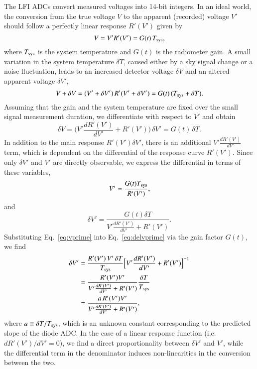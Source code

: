\documentclass[twocolumn]{aa}
\begin{document}
The LFI ADCs convert measured voltages into 14-bit integers. In an ideal world, the conversion from the true voltage $V$ to the apparent (recorded) voltage $V'$ should follow a perfectly linear response $R'(V')$ given by
\begin{equation}
V = V'R'(V') = G(t)\,T_{\rm sys},
\label{eq:perfect}
\end{equation}
where $T_{\rm sys}$ is the system temperature and $G(t)$ is the radiometer gain. A small variation in the system temperature $\delta T$, caused either by a sky signal change or a noise fluctuation, leads to an increased detector voltage $\delta V$ and an altered apparent voltage $\delta V'$,
\begin{equation}
V+\delta V = (V' + \delta V')\,R'(V' + \delta V') = G(t)\,(T_{\rm sys}+\delta T).
\label{eq:perturbation}
\end{equation}
Assuming that the gain and the system temperature are fixed over the small signal measurement duration, we differentiate with respect to $V'$ and obtain
\begin{equation}
\delta V = \Big(V' \frac{dR'(V')}{dV'} + R'(V')\Big) \, \delta V' = G(t)\, \delta T.
\label{eq:diff}
\end{equation}
In addition to the main response $R'(V')\delta V'$, there is an additional $V' \frac{dR'(V')}{dV'}$ term, which is dependent on the differential of the response curve $R'(V')$. Since only $\delta V'$ and $V'$ are directly observable, we express the differential in terms of these variables,
\begin{equation}
V' = \frac{G(t)T_{\rm sys}}{R'(V')},
\label{eq:vprime}
\end{equation}
and
\begin{equation}
\delta V' = \frac{G(t)\delta T}{V' \frac{dR'(V')}{dV'} + R'(V')}.
\label{eq:delvprime}
\end{equation}
Substituting Eq.~\eqref{eq:vprime} into Eq.~\eqref{eq:delvprime} via the gain factor $G(t)$,  we find
\begin{align}
\delta V' &= \frac{R'(V')\,V'\,\delta T}{T_{\rm sys}}\Big[V' \frac{dR'(V')}{dV'} + R'(V')\Big]^{-1}\\
&= \frac{R'(V')V'}{V' \frac{dR'(V')}{dV'} + R'(V')}\frac{\delta T}{T_{\rm sys}}\\
&= \frac{a\,R'(V')V'}{V' \frac{dR'(V')}{dV'} + R'(V')},
\label{eq:delvprime2}
\end{align}
where $a\equiv\delta T/T_{\rm sys}$, which is an unknown constant corresponding to the predicted slope of the diode ADC. In the case of a linear response function (i.e. $dR'(V')/dV' = 0$), we find a direct proportionality between $\delta V'$ and $V'$, while the differential term in the denominator induces non-linearities in the conversion between the two.
\end{document}
